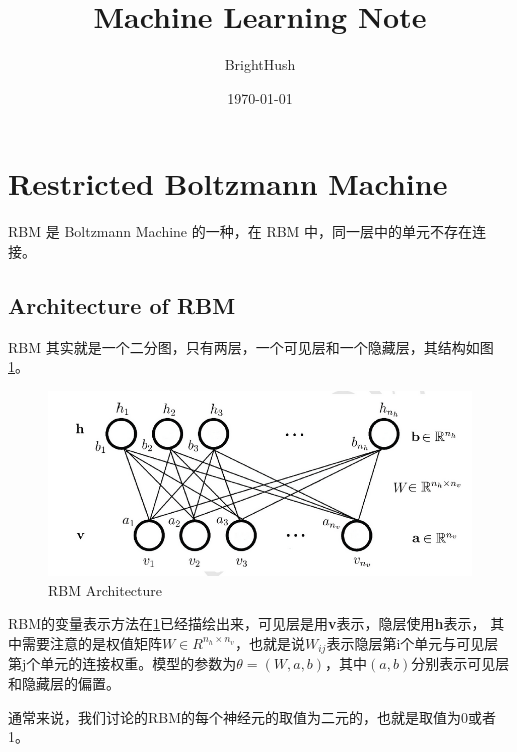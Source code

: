 \documentclass[UTF8]{ctexart}
\title{Machine Learning Note}
\author{BrightHush}
\date{\today}
\begin{document}
\maketitle
\tableofcontents

\pagestyle{fancy}
\cfoot{\thepage}

\newcommand{\figref}[1]{\figurename~\ref{#1}}

\section{Restricted Boltzmann Machine}
RBM 是 Boltzmann Machine 的一种，在 RBM 中，同一层中的单元不存在连接。

\subsection{Architecture of RBM}
RBM 其实就是一个二分图，只有两层，一个可见层和一个隐藏层，其结构如图\ref{Fig:RBM}。
\begin{figure}[h!] 
    \centering     
    \includegraphics[width=1.0\textwidth]{rbm}   
    \caption{\label{Fig:RBM}RBM Architecture} 
\end{figure}
\par
RBM的变量表示方法在\ref{Fig:RBM}已经描绘出来，可见层是用\textbf{v}表示，隐层使用\textbf{h}表示，
其中需要注意的是权值矩阵$W \in R^{n_h \times n_v} $，也就是说$ W_{ij} $表示隐层第i个单元与可见层
第j个单元的连接权重。模型的参数为$ \theta = (W, a, b) $，其中$ (a, b)$分别表示可见层和隐藏层的偏置。
\par
通常来说，我们讨论的RBM的每个神经元的取值为二元的，也就是取值为0或者1。
\end{document}
